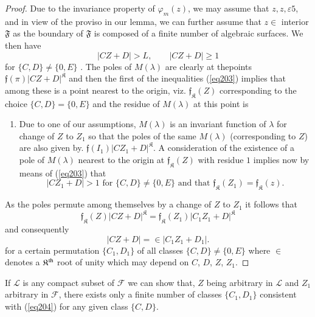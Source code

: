 \begin{proof} 
Due to the invariance property of $\varphi_m (z)$, we may assume that
$z, z, \varepsilon 5$, and in view of the proviso in our lemma, we can
further assume that $z \in$ interior $\mathfrak{F}$ as the boundary of
$\mathfrak{F}$ is composed of a finite number of algebraic
surfaces. We then have   
\begin{equation*}
|CZ + D | > L , \qquad |CZ + D | \geq 1 \tag{203}\label{eq203} 
\end{equation*}
for $\{ C,D\} \neq \{ 0 , E\}$ . The poles of $M(\lambda)$ are clearly
at the\pageoriginale points $\mathfrak{f} (\pi) |CZ + D|^\mathfrak{K}$
and then the first of 
the inequalities (\ref{eq203}) implies that among these is a point nearest
to the origin, viz. $\mathfrak{f}_\mathfrak{K} (Z)$ corresponding to the choice
$\{ C,D \} = \{ 0 , E \}$ and the residue of $M(\lambda)$ at this  
point is 
\begin{enumerate}
\item Due to one of our assumptions, $M(\lambda)$ is an invariant
  function of $\lambda$ for change of $Z$ to $Z_1$ so that the poles
  of the same $M(\lambda)$ (corresponding to $Z$) are also given
  by. $\mathfrak{f} (I_1) |CZ _1 + D |^\mathfrak{K}$. A consideration of the 
  existence of a pole of $M(\lambda)$ nearest to the origin at
  $\mathfrak{f}_\mathfrak{K} (Z)$ with residue $1$ implies now by means of
  (\ref{eq203}) that 
$$
|CZ_1 + D | > 1 \text{ for } \{C,D \} \neq \{0, E \} \text{ and that }
\mathfrak{f}_\mathfrak{K} (Z_1) = \mathfrak{f}_\mathfrak{K} (z). 
$$
\end{enumerate}


As the poles permute among themselves by a change of $Z$ to $Z_1$ it
follows that 
$$
\mathfrak{f}_\mathfrak{K} (Z) |CZ + D|^\mathfrak{K} =
\mathfrak{f}_\mathfrak{K} (Z_1) | C_1 Z_1 + D| ^\mathfrak{K} 
$$
and consequently 
\begin{equation*}
|CZ + D | = \in |C_1 Z_1 + D_1 |. \tag{204}\label{eq204} 
\end{equation*}
for a certain permutation $\{ C_1 , D_1 \}$ of all classes $\{ C, D \} 
\neq \{ 0 , E \}$ where $\in$ denotes a $\mathfrak{K}^{\rm th}$
root of unity which may depend on $C$, $D$, $Z$, $Z_1$. 
\end{proof}

If $\mathscr{L}$ is any compact subset of $\mathscr{F}$ we can show
that, $Z$ being arbitrary in $\mathscr{L}$ and $Z_1$ arbitrary in 
$\mathscr{F}$, there exists only a finite number of classes $\{ C_1 ,
D_1 \}$ consistent with (\ref{eq204}) for any given class $\{ C, D \}$. 

